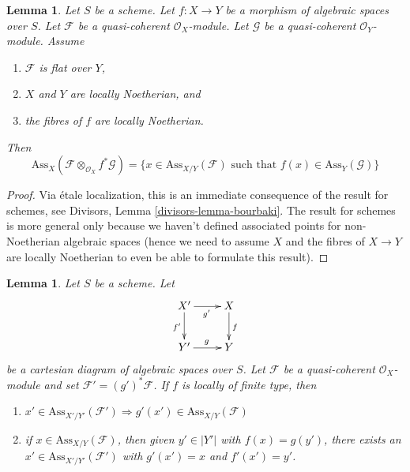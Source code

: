 \documentclass{stacks-project}
\theoremstyle{plain}
\newtheorem{lemma}[subsection]{Lemma}
\theoremstyle{definition}
\theoremstyle{remark}
\numberwithin{equation}{subsection}
\begin{document}
\begin{lemma}
\label{lemma-bourbaki}
Let $S$ be a scheme.
Let $f : X \to Y$ be a morphism of algebraic spaces over $S$.
Let $\mathcal{F}$ be a quasi-coherent $\mathcal{O}_X$-module.
Let $\mathcal{G}$ be a quasi-coherent $\mathcal{O}_Y$-module.
Assume
\begin{enumerate}
\item $\mathcal{F}$ is flat over $Y$,
\item $X$ and $Y$ are locally Noetherian, and
\item the fibres of $f$ are locally Noetherian.
\end{enumerate}
Then
$$
\text{Ass}_X(\mathcal{F} \otimes_{\mathcal{O}_X} f^*\mathcal{G}) =
\{x \in \text{Ass}_{X/Y}(\mathcal{F})\text{ such that }
f(x) \in \text{Ass}_Y(\mathcal{G}) \}
$$
\end{lemma}

\begin{proof}
Via \'etale localization, this is an immediate consequence of the result
for schemes, see
Divisors, Lemma \ref{divisors-lemma-bourbaki}.
The result for schemes is more general only because
we haven't defined associated points for
non-Noetherian algebraic spaces (hence we need to assume $X$
and the fibres of $X \to Y$ are locally Noetherian to even
be able to formulate this result).
\end{proof}

\begin{lemma}
\label{lemma-base-change-relative-assassin}
Let $S$ be a scheme. Let
$$
\xymatrix{
X' \ar[d]_{f'} \ar[r]_{g'} & X \ar[d]^f \\
Y' \ar[r]^g & Y
}
$$
be a cartesian diagram of algebraic spaces over $S$.
Let $\mathcal{F}$ be a quasi-coherent $\mathcal{O}_X$-module
and set $\mathcal{F}' = (g')^*\mathcal{F}$.
If $f$ is locally of finite type, then
\begin{enumerate}
\item $x' \in \text{Ass}_{X'/Y'}(\mathcal{F}')
\Rightarrow g'(x') \in \text{Ass}_{X/Y}(\mathcal{F})$
\item if $x \in \text{Ass}_{X/Y}(\mathcal{F})$, then given
$y' \in |Y'|$ with $f(x) = g(y')$, there exists an
$x' \in \text{Ass}_{X'/Y'}(\mathcal{F}')$
with $g'(x') = x$ and $f'(x') = y'$.
\end{enumerate}
\end{lemma}
\end{document}
